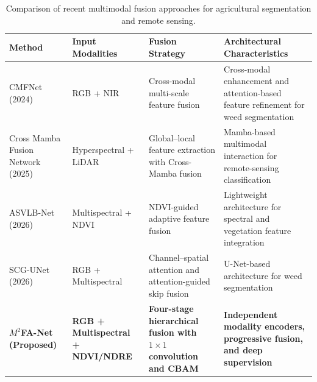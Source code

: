 \documentclass[pdflatex,sn-mathphys-num]{sn-jnl}
\begin{document}
\begin{table}[t]

\centering
\small
\setlength{\tabcolsep}{4pt}
\renewcommand{\arraystretch}{1.3}

\caption{Comparison of recent multimodal fusion approaches
for agricultural segmentation and remote sensing.}
\label{tab:fusion_comparison}

\begin{tabular}{p{}
                p{}
                p{}
                p{}}
\hline
\textbf{Method} &
\textbf{Input Modalities} &
\textbf{Fusion Strategy} &
\textbf{Architectural Characteristics} \\
\hline

CMFNet (2024)\cite{fan2024cmfnet}
& RGB + NIR
& Cross-modal multi-scale feature fusion
& Cross-modal enhancement and attention-based
feature refinement for weed segmentation \\

\hline

Cross Mamba Fusion Network (2025)\cite{cmfnet2025mamba}
& Hyperspectral + LiDAR
& Global--local feature extraction with
Cross-Mamba fusion
& Mamba-based multimodal interaction for
remote-sensing classification \\

\hline

ASVLB-Net (2026)\cite{dong2026asvlb}
& Multispectral + NDVI
& NDVI-guided adaptive feature fusion
& Lightweight architecture for spectral
and vegetation feature integration \\

\hline

SCG-UNet (2026)\cite{li2026scgunet}
& RGB + Multispectral
& Channel--spatial attention and
attention-guided skip fusion
& U-Net-based architecture for
weed segmentation \\

\hline

\textbf{$M^2$FA-Net (Proposed)}
& \textbf{RGB + Multispectral + NDVI/NDRE}
& \textbf{Four-stage hierarchical fusion
with $1\times1$ convolution and CBAM}
& \textbf{Independent modality encoders,
progressive fusion, and deep supervision} \\

\hline
\end{tabular}
\end{table}
\end{document}
